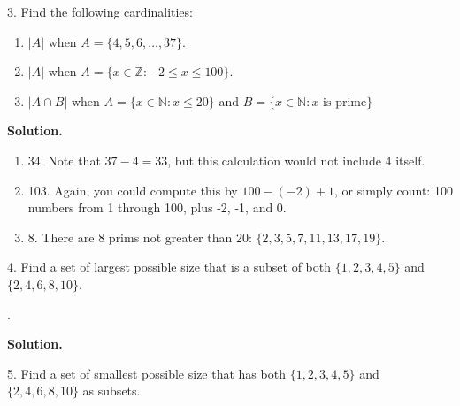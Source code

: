 \documentclass[10pt,]{book}
\theoremstyle{plain}
\theoremstyle{definition}
\theoremstyle{definition}
\numberwithin{equation}{chapter}
\newcommand{\N}{\mathbb N}
\newcommand{\Z}{\mathbb Z}
\newcommand{\st}{:}
\begin{document}
\begin{exerciselist}
\begin{enumerate}[label=(\alph*)]
\end{enumerate}
%
\par
\item[3.]\hypertarget{exercise-23}{}\noindent%
\hypertarget{p-472}{}%
Find the following cardinalities: \leavevmode%
\begin{enumerate}[label=(\alph*)]
\item\hypertarget{li-324}{}\hypertarget{p-473}{}%
\(|A|\) when \(A = \{4,5,6,\ldots,37\}\).   \framebox[5em]{\raisebox{1ex}{}}%
\item\hypertarget{li-325}{}\hypertarget{p-474}{}%
\(|A|\) when \(A = \{x \in \Z \st -2 \le x \le 100\}\).   \framebox[5em]{\raisebox{1ex}{}}%
\item\hypertarget{li-326}{}\hypertarget{p-475}{}%
\(|A \cap B|\) when \(A = \{x \in \N \st x \le 20\}\) and \(B = \{x \in \N \st x \mbox{ is prime} \}\)  \framebox[5em]{\raisebox{1ex}{}}%
\end{enumerate}
%
\par
\medskip\noindent%
\textbf{Solution.}\quad \hypertarget{p-476}{}%
\leavevmode%
\begin{enumerate}[label=(\alph*)]
\item\hypertarget{li-327}{}\hypertarget{p-477}{}%
34. Note that \(37-4 = 33\), but this calculation would not include 4 itself.%
\item\hypertarget{li-328}{}\hypertarget{p-478}{}%
103. Again, you could compute this by \(100-(-2)+1\), or simply count: 100 numbers from 1 through 100, plus -2, -1, and 0.%
\item\hypertarget{li-329}{}\hypertarget{p-479}{}%
8. There are 8 prims not greater than 20: \(\{2, 3, 5, 7, 11, 13, 17, 19\}\).%
\end{enumerate}
%
\par
\item[4.]\hypertarget{exercise-24}{}\noindent%
\hypertarget{p-480}{}%
Find a set of largest possible size that is a subset of both \(\{1, 2, 3, 4, 5\}\) and \(\{2, 4, 6, 8,10\}\).%
\par
\hypertarget{p-481}{}%
 \framebox[15em]{\raisebox{1ex}{}}.%
\par
\medskip\noindent%
\textbf{Solution.}\quad \hypertarget{p-482}{}%
%
\par
\item[5.]\hypertarget{exercise-25}{}\noindent%
\hypertarget{p-483}{}%
Find a set of smallest possible size that has both \(\{1,2,3,4,5\}\) and \(\{2,4,6,8,10\}\) as subsets.%
\par
\hypertarget{p-484}{}%
 \framebox[15em]{\raisebox{1ex}{}}%

\end{exerciselist}
\end{document}
